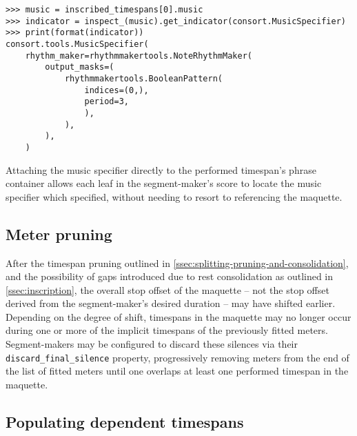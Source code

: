 \begin{comment}
<abjad>
music = inscribed_timespans[0].music
indicator = inspect_(music).get_indicator(consort.MusicSpecifier)
print(format(indicator))
</abjad>
\end{comment}

\begin{abjadbookoutput}
\begin{singlespacing}
\vspace{-0.5\baselineskip}
\begin{lstlisting}
>>> music = inscribed_timespans[0].music
>>> indicator = inspect_(music).get_indicator(consort.MusicSpecifier)
>>> print(format(indicator))
consort.tools.MusicSpecifier(
    rhythm_maker=rhythmmakertools.NoteRhythmMaker(
        output_masks=(
            rhythmmakertools.BooleanPattern(
                indices=(0,),
                period=3,
                ),
            ),
        ),
    )
\end{lstlisting}
\end{singlespacing}
\end{abjadbookoutput}

\noindent Attaching the music specifier directly to the performed timespan's
phrase container allows each leaf in the segment-maker's score to locate the
music specifier which specified, without needing to resort to referencing the
maquette.

\subsection{Meter pruning}
\label{ssec:meter-pruning}

After the timespan pruning outlined in
\autoref{ssec:splitting-pruning-and-consolidation}, and the possibility of gaps
introduced due to rest consolidation as outlined in \autoref{ssec:inscription},
the overall stop offset of the maquette -- not the stop offset derived from the
segment-maker's desired duration -- may have shifted earlier. Depending on the
degree of shift, timespans in the maquette may no longer occur during one or
more of the implicit timespans of the previously fitted meters. Segment-makers
may be configured to discard these silences via their
\texttt{discard\_final\_silence} property, progressively removing meters from
the end of the list of fitted meters until one overlaps at least one performed
timespan in the maquette.

\subsection{Populating dependent timespans}
\label{ssec:populating-dependent-timespans}

